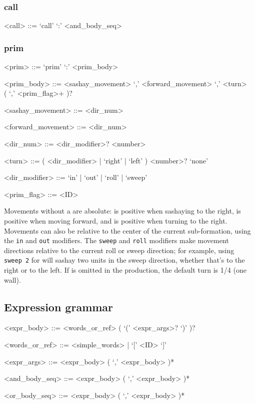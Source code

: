 \documentclass[12pt]{article}
\renewcommand{\call}[1]{\texttt{#1}} %
\begin{document}
\subsubsection{call}
\begin{grammar}
<call> ::= `call' `:' <and_body_seq>
\end{grammar}

\subsubsection{prim}
\begin{grammar}
<prim> ::= `prim' `:' <prim_body>

<prim_body> ::= <sashay_movement> `,' <forward_movement> `,' <turn> \\ ( `,' <prim_flag>+ )?

<sashay_movement> ::= <dir_num>

<forward_movement> ::= <dir_num>

<dir_num> ::= <dir_modifier>? <number>

<turn> ::= ( <dir_modifier> | `right' | `left' ) <number>?
       \alt  `none'

<dir_modifier> ::= `in' | `out' | `roll' | `sweep'

<prim_flag> ::= <ID>
\end{grammar}

Movements without a  are absolute:
 is positive when sashaying to the right,
 is positive when moving forward, and
 is positive when turning to the right.  Movements can
also be relative to the center of the current sub-formation, using the
\call{in} and \call{out} modifiers.  The \call{sweep} and \call{roll}
modifiers make movement directions relative to the current roll or
sweep direction; for example, using \call{sweep~2} for
 will sashay two units in the sweep
direction, whether that's to the right or to the left.  If
 is omitted in the  production, the
default turn is 1/4 (one wall).

\subsection{Expression grammar}
\begin{grammar}
<expr_body> ::= <words_or_ref> ( `(' <expr_args>? `)' )?

<words_or_ref> ::= <simple_words> | `[' <ID> `]'

<expr_args> ::= <expr_body> ( `,' <expr_body> )*

<and_body_seq> ::= <expr_body> ( `,' <expr_body> )*

<or_body_seq> ::= <expr_body> ( `,' <expr_body> )*
\end{grammar}
\end{document}
